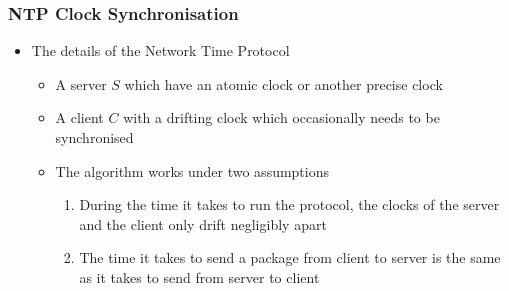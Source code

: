 \documentclass[11pt]{article}
\begin{document}
\subsubsection{NTP Clock Synchronisation}
\label{sec:orgbb6f683}
\begin{itemize}
\item The details of the Network Time Protocol
\begin{itemize}
\item A server \(S\) which have an atomic clock or another precise clock
\item A client \(C\) with a drifting clock which occasionally needs to be synchronised
\item The algorithm works under two assumptions
\begin{enumerate}
\item During the time it takes to run the protocol, the clocks of the server and the client only drift negligibly apart
\item The time it takes to send a package from client to server is the same as it takes to send from server to client
\end{enumerate}
\end{itemize}
\end{itemize}
\end{document}
